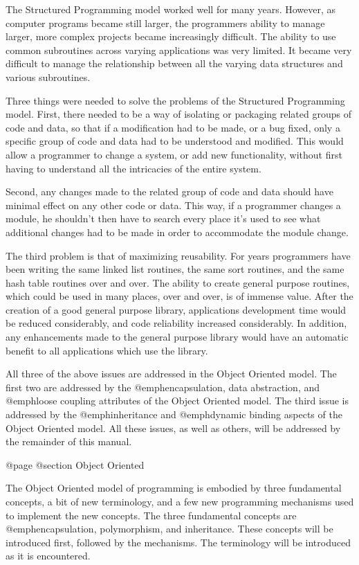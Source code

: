 The Structured Programming model worked well for many years.  However,
as computer programs became still larger, the programmers ability to
manage larger, more complex projects became increasingly difficult.  The
ability to use common subroutines across varying applications was very
limited.  It became very difficult to manage the relationship between
all the varying data structures and various subroutines.

Three things were needed to solve the problems of the Structured Programming
model.  First, there needed to be a way of isolating or packaging related
groups of code and data, so that if a modification had to be made, or a bug 
fixed, only a specific group of code and data had to be understood and
modified.  This would allow a programmer to change a system, or add new
functionality, without first having to understand all the intricacies of the
entire system.

Second, any changes made to the related group of code and data should
have minimal effect on any other code or data.  This way, if a
programmer changes a module, he shouldn't then have to search every
place it's used to see what additional changes had to be made in order
to accommodate the module change.

The third problem is that of maximizing reusability.  For years
programmers have been writing the same linked list routines, the same
sort routines, and the same hash table routines over and over.  The
ability to create general purpose routines, which could be used in many
places, over and over, is of immense value.  After the creation of
a good general purpose library, applications development time would be
reduced considerably, and code reliability increased considerably.
In addition, any enhancements made to the general purpose library
would have an automatic benefit to all applications which use the library.

All three of the above issues are addressed in the Object Oriented
model.  The first two are addressed by the @emph{encapsulation, data
abstraction}, and @emph{loose coupling} attributes of the Object Oriented
model.  The third issue is addressed by the @emph{inheritance} and
@emph{dynamic binding} aspects of the Object Oriented model.  All these
issues, as well as others, will be addressed by the remainder of this
manual.

@page
@section Object Oriented

The Object Oriented model of programming is embodied by three
fundamental concepts, a bit of new terminology, and a few new
programming mechanisms used to implement the new concepts.  The three
fundamental concepts are @emph{encapsulation, polymorphism, and inheritance}.
These concepts will be introduced first, followed by the mechanisms.
The terminology will be introduced as it is encountered.

